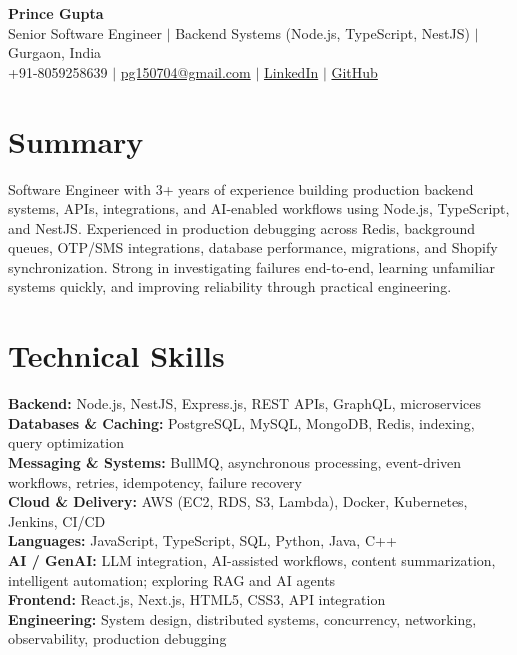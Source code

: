 \documentclass[letterpaper,10pt]{article}
\begin{document}
\begin{center}
{\Huge \textbf{Prince Gupta}}\\ \vspace{3pt}
\small Senior Software Engineer $|$ Backend Systems (Node.js, TypeScript, NestJS) $|$ Gurgaon, India\\
\small +91-8059258639 $|$ \href{mailto:pg150704@gmail.com}{pg150704@gmail.com} $|$
\href{https://www.linkedin.com/in/princegupta-dev}{LinkedIn} $|$
\href{https://github.com/princegupta-dev}{GitHub}
\end{center}

\section{Summary}
\small{Software Engineer with 3+ years of experience building production backend systems, APIs, integrations, and AI-enabled workflows using Node.js, TypeScript, and NestJS. Experienced in production debugging across Redis, background queues, OTP/SMS integrations, database performance, migrations, and Shopify synchronization. Strong in investigating failures end-to-end, learning unfamiliar systems quickly, and improving reliability through practical engineering.}

\section{Technical Skills}
\begin{itemize}[leftmargin=.15in,label={}]
\small{\item{
\textbf{Backend:} Node.js, NestJS, Express.js, REST APIs, GraphQL, microservices\\
\textbf{Databases \& Caching:} PostgreSQL, MySQL, MongoDB, Redis, indexing, query optimization\\
\textbf{Messaging \& Systems:} BullMQ, asynchronous processing, event-driven workflows, retries, idempotency, failure recovery\\
\textbf{Cloud \& Delivery:} AWS (EC2, RDS, S3, Lambda), Docker, Kubernetes, Jenkins, CI/CD\\
\textbf{Languages:} JavaScript, TypeScript, SQL, Python, Java, C++\\
\textbf{AI / GenAI:} LLM integration, AI-assisted workflows, content summarization, intelligent automation; exploring RAG and AI agents\\
\textbf{Frontend:} React.js, Next.js, HTML5, CSS3, API integration\\
\textbf{Engineering:} System design, distributed systems, concurrency, networking, observability, production debugging
}}
\end{itemize}
\end{document}
